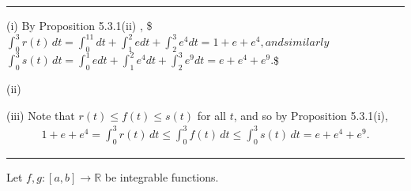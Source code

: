 \documentclass[letterpaper,10pt,english]{jupyterBook}
\begin{document}
\bigskip\hrule\bigskip


\sphinxAtStartPar
{\hyperref[\detokenize{Problems:id68}]{}}
(i) By Proposition 5.3.1(ii) ,
\$\(
\int_0^3 r(t)\, dt = \int_0^11dt+\int_1^2edt+\int_2^3e^4dt = 1+e+e^4,
\)\(
and similarly
\)\(
\int_0^3 s(t)\, dt = \int_0^1edt+\int_1^2e^4dt+\int_2^3e^9dt = e+e^4+e^9.
\)\$

\sphinxAtStartPar
(ii)

\sphinxAtStartPar
(iii) Note that \(r(t)\leq f(t)\leq s(t)\) for all \(t\), and so by Proposition 5.3.1(i),
\begin{equation*}
\begin{split}
1+e+e^4  = \int_0^3 r(t)\, dt \leq \int_0^3 f(t)\, dt \leq \int_0^3 s(t)\, dt = e+e^4+e^9.
\end{split}
\end{equation*}

\bigskip\hrule\bigskip


\sphinxAtStartPar
{\hyperref[\detokenize{Problems:id69}]{}} Let \(f,g:[a,b]\to\mathbb{R}\) be integrable functions.
\end{document}
